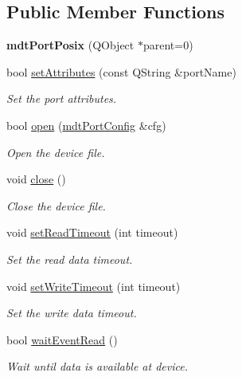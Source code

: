 \subsection*{Public Member Functions}
\begin{DoxyCompactItemize}
\item 
\hypertarget{classmdt_port_posix_ac122e8dde0e224afb3557d29a62de114}{
{\bfseries mdtPortPosix} (QObject $\ast$parent=0)}
\label{classmdt_port_posix_ac122e8dde0e224afb3557d29a62de114}

\item 
bool \hyperlink{classmdt_port_posix_a32a532f5148226da19ee4acc6ec63201}{setAttributes} (const QString \&portName)
\begin{DoxyCompactList}\small\item\em Set the port attributes. \end{DoxyCompactList}\item 
bool \hyperlink{classmdt_port_posix_aba7e87cb2423bfd61a248cc5d23a8517}{open} (\hyperlink{classmdt_port_config}{mdtPortConfig} \&cfg)
\begin{DoxyCompactList}\small\item\em Open the device file. \end{DoxyCompactList}\item 
void \hyperlink{classmdt_port_posix_a778c8d4f6fadd1da725f4287af38f7f0}{close} ()
\begin{DoxyCompactList}\small\item\em Close the device file. \end{DoxyCompactList}\item 
void \hyperlink{classmdt_port_posix_a7ab7e4a7dccbd58702f2c37335b900c8}{setReadTimeout} (int timeout)
\begin{DoxyCompactList}\small\item\em Set the read data timeout. \end{DoxyCompactList}\item 
void \hyperlink{classmdt_port_posix_a577a51bf0373f478b32bb1c1e5c4726c}{setWriteTimeout} (int timeout)
\begin{DoxyCompactList}\small\item\em Set the write data timeout. \end{DoxyCompactList}\item 
bool \hyperlink{classmdt_port_posix_aeb743174f4c53ddd92d2f2e738158d07}{waitEventRead} ()
\begin{DoxyCompactList}\small\item\em Wait until data is available at device. \end{DoxyCompactList}\item 

\end{DoxyCompactItemize}
